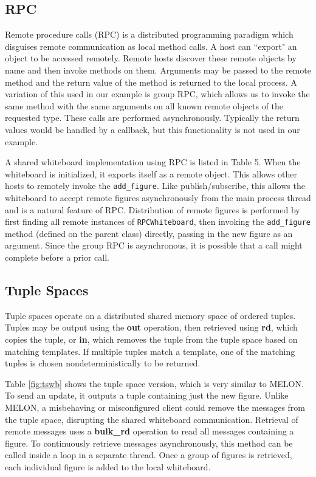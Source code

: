 \documentclass{llncs}
\begin{document}
\subsection{RPC}

Remote procedure calls (RPC) is a distributed programming paradigm which disguises remote communication as local method calls. A host can ``export" an object to be accessed remotely. Remote hosts discover these remote objects by name and then invoke methods on them. Arguments may be passed to the remote method and the return value of the method is returned to the local process. A variation of this used in our example is group RPC, which allows us to invoke the same method with the same arguments on all known remote objects of the requested type. These calls are performed asynchronously. Typically the return values would be handled by a callback, but this functionality is not used in our example.

A shared whiteboard implementation using RPC is listed in Table 5. When the whiteboard is initialized, it exports itself as a remote object. This allows other hosts to remotely invoke the \texttt{add\_figure}. Like publish/subscribe, this allows the whiteboard to accept remote figures asynchronously from the main process thread and is a natural feature of RPC. Distribution of remote figures is performed by first finding all remote instances of \texttt{RPCWhiteboard}, then invoking the \texttt{add\_figure} method (defined on the parent class) directly, passing in the new figure as an argument. Since the group RPC is asynchronous, it is possible that a call might complete before a prior call.

\subsection{Tuple Spaces}

Tuple spaces operate on a distributed shared memory space of ordered tuples. Tuples may be output using the \textbf{out} operation, then retrieved using \textbf{rd}, which copies the tuple, or \textbf{in}, which removes the tuple from the tuple space based on matching templates. If multiple tuples match a template, one of the matching tuples is chosen nondeterministically to be returned.

Table \ref{fig:tswb} shows the tuple space version, which is very similar to MELON. To send an update, it outputs a tuple containing just the new figure. Unlike MELON, a misbehaving or misconfigured client could remove the messages from the tuple space, disrupting the shared whiteboard communication. Retrieval of remote messages uses a \textbf{bulk\_rd} operation to read all messages containing a figure. To continuously retrieve messages asynchronously, this method can be called inside a loop in a separate thread. Once a group of figures is retrieved, each individual figure is added to the local whiteboard. 
\end{document}
